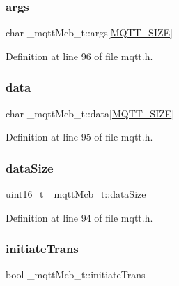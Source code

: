 \subsubsection{\texorpdfstring{args}{args}}
{\footnotesize\ttfamily char \+\_\+mqtt\+Mcb\+\_\+t\+::args\mbox{[}\hyperlink{mqtt_8h_ab4dd3a15b57435a3cd9a97736f4366a8}{M\+Q\+T\+T\+\_\+\+S\+I\+ZE}\mbox{]}}



Definition at line 96 of file mqtt.\+h.

\mbox{\label{struct__mqttMcb__t_a007841c0e069c54cc67965906022496a}} 
\subsubsection{\texorpdfstring{data}{data}}
{\footnotesize\ttfamily char \+\_\+mqtt\+Mcb\+\_\+t\+::data\mbox{[}\hyperlink{mqtt_8h_ab4dd3a15b57435a3cd9a97736f4366a8}{M\+Q\+T\+T\+\_\+\+S\+I\+ZE}\mbox{]}}



Definition at line 95 of file mqtt.\+h.

\mbox{\label{struct__mqttMcb__t_ae44a8d1ad53b2786df67ab57179d50ae}} 
\subsubsection{\texorpdfstring{data\+Size}{dataSize}}
{\footnotesize\ttfamily uint16\+\_\+t \+\_\+mqtt\+Mcb\+\_\+t\+::data\+Size}



Definition at line 94 of file mqtt.\+h.

\mbox{\label{struct__mqttMcb__t_aacc31f6cb888369dc2294e11898c3114}} 
\subsubsection{\texorpdfstring{initiate\+Trans}{initiateTrans}}
{\footnotesize\ttfamily bool \+\_\+mqtt\+Mcb\+\_\+t\+::initiate\+Trans}



